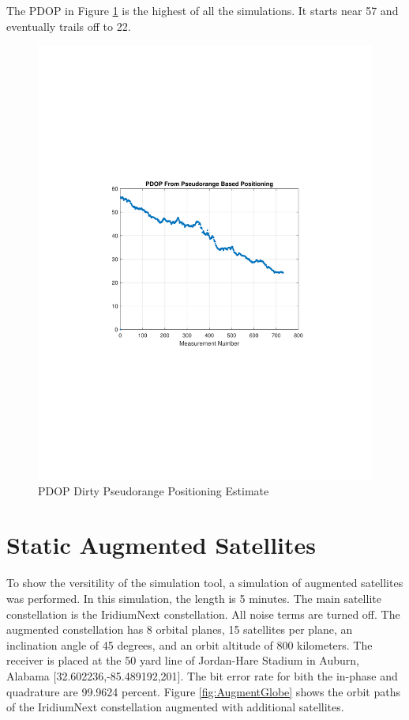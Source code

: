 \documentclass[12pt]{report}
\begin{document}
The PDOP in Figure \ref{fig:PDOPDirtyPseudorange15minIridPosit} is the highest of all the simulations. It starts near 57 and eventually trails off to 22.
\begin{figure}[h!]
    \centering
    \includegraphics[trim=1.2in 3.3in 1.75in 3.3in,clip,width=5in]
    {Irid_15min_noisy_PDOPpseudo.pdf}
    \caption{PDOP Dirty Pseudorange Positioning Estimate}
    \label{fig:PDOPDirtyPseudorange15minIridPosit}
\end{figure}

\pagebreak
\section{Static Augmented Satellites}
To show the versitility of the simulation tool, a simulation of augmented satellites was performed. In this simulation, the length is 5 minutes. The main satellite constellation is the IridiumNext constellation. All noise terms are turned off. The augmented constellation has 8 orbital planes, 15 satellites per plane, an inclination angle of 45 degrees, and an orbit altitude of 800 kilometers. The receiver is placed at the 50 yard line of Jordan-Hare Stadium in Auburn, Alabama [32.602236,-85.489192,201]. The bit error rate for bith the in-phase and quadrature are 99.9624 percent. Figure \ref{fig:AugmentGlobe} shows the orbit paths of the IridiumNext constellation augmented with additional satellites. 
\end{document}
